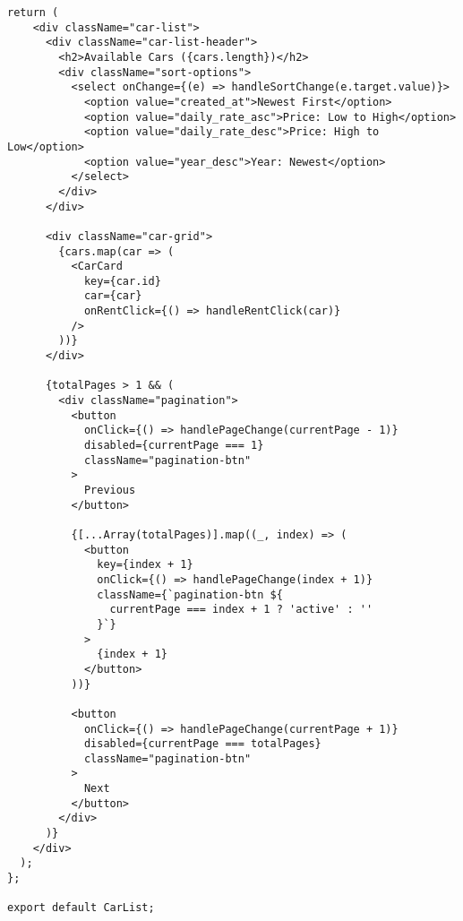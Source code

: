 \documentclass[12pt,a4paper]{article}
\begin{document}
\begin{lstlisting}[caption=CarList Component]
  return (
    <div className="car-list">
      <div className="car-list-header">
        <h2>Available Cars ({cars.length})</h2>
        <div className="sort-options">
          <select onChange={(e) => handleSortChange(e.target.value)}>
            <option value="created_at">Newest First</option>
            <option value="daily_rate_asc">Price: Low to High</option>
            <option value="daily_rate_desc">Price: High to Low</option>
            <option value="year_desc">Year: Newest</option>
          </select>
        </div>
      </div>

      <div className="car-grid">
        {cars.map(car => (
          <CarCard 
            key={car.id} 
            car={car} 
            onRentClick={() => handleRentClick(car)}
          />
        ))}
      </div>

      {totalPages > 1 && (
        <div className="pagination">
          <button 
            onClick={() => handlePageChange(currentPage - 1)}
            disabled={currentPage === 1}
            className="pagination-btn"
          >
            Previous
          </button>
          
          {[...Array(totalPages)].map((_, index) => (
            <button
              key={index + 1}
              onClick={() => handlePageChange(index + 1)}
              className={`pagination-btn ${
                currentPage === index + 1 ? 'active' : ''
              }`}
            >
              {index + 1}
            </button>
          ))}
          
          <button 
            onClick={() => handlePageChange(currentPage + 1)}
            disabled={currentPage === totalPages}
            className="pagination-btn"
          >
            Next
          </button>
        </div>
      )}
    </div>
  );
};

export default CarList;
\end{lstlisting}
\end{document}
